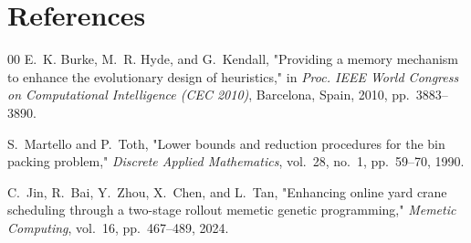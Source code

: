 \documentclass[conference]{IEEEtran}
\begin{document}

\section*{References}

\begin{thebibliography}{00}
 E.~K. Burke, M.~R. Hyde, and G.~Kendall, "Providing a memory mechanism to enhance the evolutionary design of heuristics," in \emph{Proc. IEEE World Congress on Computational Intelligence (CEC 2010)}, Barcelona, Spain, 2010, pp.~3883--3890.

 S.~Martello and P.~Toth, "Lower bounds and reduction procedures for the bin packing problem," \emph{Discrete Applied Mathematics}, vol.~28, no.~1, pp.~59--70, 1990.

 C.~Jin, R.~Bai, Y.~Zhou, X.~Chen, and L.~Tan, "Enhancing online yard crane scheduling through a two-stage rollout memetic genetic programming," \emph{Memetic Computing}, vol.~16, pp.~467--489, 2024.
\end{thebibliography}
\end{document}
